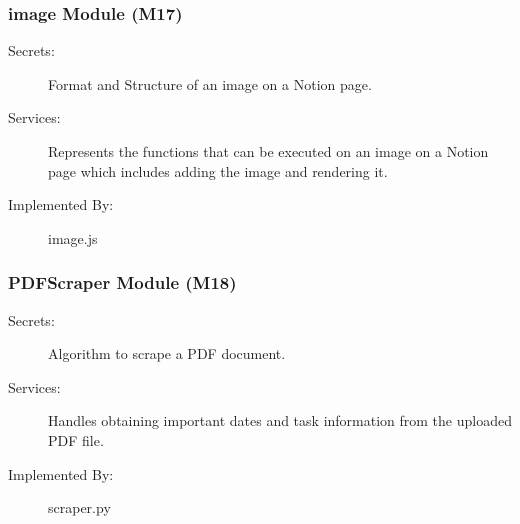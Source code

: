 \documentclass[12pt, titlepage]{article}
\begin{document}
\subsubsection{image Module (M17)}

\begin{description}
\item[Secrets:] Format and Structure of an image on a Notion page.
\item[Services:] Represents the functions that can be executed on an image on a Notion page which includes adding the image and rendering it.
\item[Implemented By:] image.js
\end{description}

\subsubsection{PDFScraper Module (M18)}

\begin{description}
\item[Secrets:] Algorithm to scrape a PDF document.
\item[Services:] Handles obtaining important dates and task information from the uploaded PDF file.
\item[Implemented By:] scraper.py
\end{description}
\end{document}
